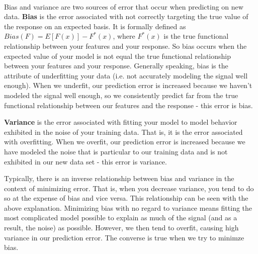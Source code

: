 \documentclass[11pt]{article}
\begin{document}
\begin{center}

\ \\
\end{center}


\vspace{5 mm}
\noindent
Bias and variance are two sources of error that occur when predicting on new
data. {\bf Bias} is the error associated with not correctly targeting the true
value of the response on an expected basis. It is formally defined as $Bias(F) =
E[F(x)] - F^{*}(x)$, where $F^{*}(x)$ is the true functional relationship
between your features and your response. So bias occurs when the expected value
of your model is not equal the true functional relationship between your
features and your response. Generally speaking, bias is the attribute of
underfitting your data (i.e. not accurately modeling the signal well enough).
When we underfit, our prediction error is increased because we haven't modeled
the signal well enough, so we consistently predict far from the true functional
relationship between our features and the response - this error is bias.

\vspace{5 mm}
\noindent
{\bf Variance} is the error associated with fitting your model to model behavior
exhibited in the noise of your training data. That is, it is the error
associated with overfitting. When we overfit, our prediction error is
increased because we have modeled the noise that is particular to our training
data and is not exhibited in our new data set - this error is variance.

\vspace{5 mm}
\noindent
Typically, there is an inverse relationship between bias and variance in the
context of minimizing error. That is, when you decrease variance, you tend to do
so at the expense of bias and vice versa. This relationship can be seen with the
above explanation. Minimizing bias with no regard to variance means fitting the
most complicated model possible to explain as much of the signal (and as a
result, the noise) as possible. However, we then tend to overfit, causing high
variance in our prediction error. The converse is true when we try to minimze
bias.
\end{document}
